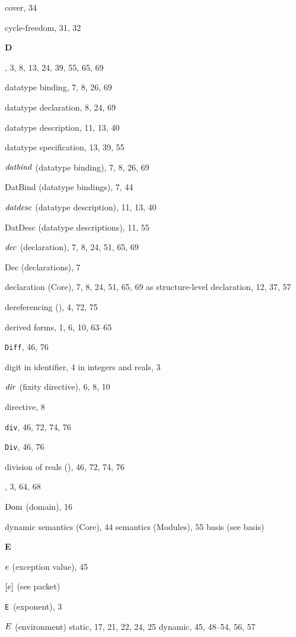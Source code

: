 \begin{theindex}
\item cover, 34
\item cycle-freedom, 31, 32
\indexspace
\parbox{65mm}{\hfil{\large\bf D}\hfil}
\indexspace
\item \DATATYPE, 3, 8, 13, 24, 39, 55, 65, 69
\item datatype binding, 7, 8, 26, 69
\item datatype declaration, 8, 24, 69
\item datatype description, 11, 13, 40
\item datatype specification, 13, 39, 55
\item ${\it datbind}$ (datatype binding), 7, 8, 26, 69
\item DatBind (datatype bindings), 7, 44
\item ${\it datdesc}$ (datatype description), 11, 13, 40
\item DatDesc (datatype descriptions), 11, 55
\item ${\it dec}$ (declaration), 7, 8, 24, 51, 65, 69
\item Dec (declarations), 7
\item declaration (Core), 7, 8, 24, 51, 65, 69
\subitem as structure-level declaration, 12, 37, 57
\item dereferencing (\ml{!}), 4, 72, 75
\item derived forms, 1, 6, 10, 63--65
\item {\tt Diff}, 46, 76
\item digit 
\subitem in identifier, 4
\subitem in integers and reals, 3
\item ${\it dir}$ (fixity directive), 6, 8, 10
\item directive, 8
\item {\tt div}, 46, 72, 74, 76
\item {\tt Div}, 46, 76
\item division of reals (\ml{/}), 46, 72, 74, 76
\item \DO, 3, 64, 68
\item $\mathop{\rm Dom}\nolimits$ (domain), 16
\item dynamic 
\subitem semantics (Core), 44
\subitem semantics (Modules), 55
\subitem basis (see basis) 
\indexspace
\parbox{65mm}{\hfil{\large\bf E}\hfil}
\indexspace
\item $e$ (exception value), 45
\item $[e]$ (see packet) 
\item \verb+E+\ (exponent), 3
\item $E$ (environment) 
\subitem static, 17, 21, 22, 24, 25
\subitem dynamic, 45, 48--54, 56, 57

\end{theindex}
